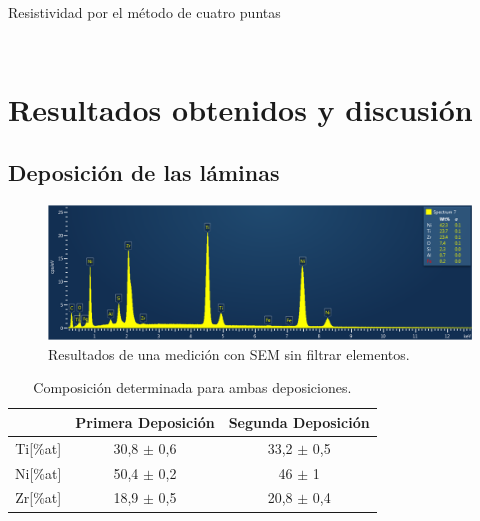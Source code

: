 \documentclass[11pt]{beamer}
\begin{document}
\begin{frame}{Resistividad por el método de cuatro puntas}
\begin{columns}
\begin{column}{.49\textwidth}
\begin{figure}[H]
					\end{figure}
				\end{column}
			\end{columns}
		\end{frame}
	
\section{Resultados obtenidos y discusión}
	\subsection{Deposición de las láminas}
		\begin{frame}
			\begin{figure}
				\includegraphics[scale=0.25]{img/SEMAllElements.png}
				\caption*{Resultados de una medición con SEM sin filtrar elementos.}
			\end{figure}
			\begin{table}[H]
				\centering
				\begin{tabular}{c|c|c|}
				\cline{2-3}
				\multicolumn{1}{l|}{} & Primera Deposición & Segunda Deposición \\ \hline
				\multicolumn{1}{|c|}{Ti{[}\%at{]}} & 30,8 $\pm$ 0,6 & 33,2 $\pm$ 0,5 \\ \hline
				\multicolumn{1}{|c|}{Ni{[}\%at{]}} & 50,4 $\pm$ 0,2 & 46 $\pm$ 1 \\ \hline
				\multicolumn{1}{|c|}{Zr{[}\%at{]}} & 18,9 $\pm$ 0,5 & 20,8 $\pm$ 0,4 \\ \hline
				\end{tabular}
				\caption*{Composición determinada para ambas deposiciones.}
				\label{compositionAvg}
			\end{table}
		\end{frame}
\end{document}
